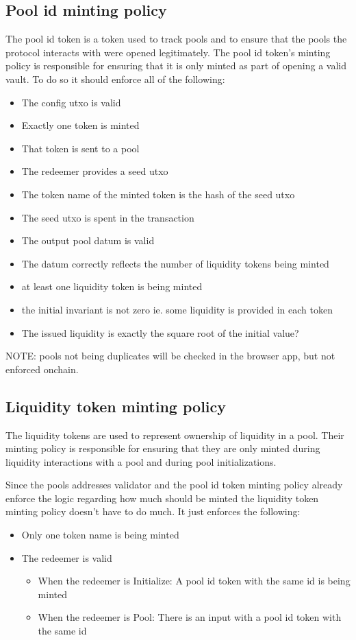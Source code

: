 \documentclass{article}
\begin{document}
\subsection{Pool id minting policy}

The pool id token is a token used to track pools
and to ensure that the pools the protocol interacts with were opened legitimately.
The pool id token's minting policy is responsible for ensuring
that it is only minted as part of opening a valid vault.
To do so it should enforce all of the following:

\begin{itemize}
	\item The config utxo is valid
	\item Exactly one token is minted
	\item That token is sent to a pool
	\item The redeemer provides a seed utxo
	\item The token name of the minted token is the hash of the seed utxo
	\item The seed utxo is spent in the transaction
	\item The output pool datum is valid
	\item The datum correctly reflects the number of liquidity tokens being minted
	\item at least one liquidity token is being minted
	\item the initial invariant is not zero ie. some liquidity is provided in each token
	\item The issued liquidity is exactly the square root of the initial value?
\end{itemize}

NOTE: pools not being duplicates will be checked in the browser app, but not enforced onchain.

\subsection{Liquidity token minting policy}

The liquidity tokens are used to represent ownership of liquidity in a pool.
Their minting policy is responsible for ensuring that they are only minted
during liquidity interactions with a pool and during pool initializations.

Since the pools addresses validator and the pool id token minting policy
already enforce the logic regarding how much should be minted the liquidity
token minting policy doesn't have to do much. It just enforces the following:
\begin{itemize}
	\item Only one token name is being minted
	\item The redeemer is valid
		\begin{itemize}
			\item When the redeemer is Initialize: A pool id token with the same id is being minted
			\item When the redeemer is Pool: There is an input with a pool id token with the same id
		\end{itemize}
\end{itemize}
\end{document}
